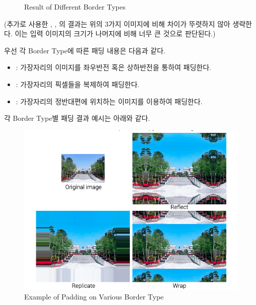 \documentclass{report}
\begin{document}
\begin{figure}[htbp]
    \medskip

    \hspace{1pt}
    \hspace{1pt}

    \caption{Result of Different Border Types}
\end{figure}

(추가로 사용한 , , 의 결과는 위의 3가지 이미지에 비해 차이가 뚜렷하지 않아 생략한다. 이는 입력 이미지의 크기가 나머지에 비해 너무 큰 것으로 판단된다.)


우선 각 Border Type에 따른 패딩 내용은 다음과 같다.

\begin{itemize}
    \item {} : 가장자리의 이미지를 좌우반전 혹은 상하반전을 통하여 패딩한다.
    \item {} : 가장자리의 픽셀들을 복제하여 패딩한다.
    \item {} : 가장자리의 정반대편에 위치하는 이미지를 이용하여 패딩한다.
\end{itemize}

각 Border Type별 패딩 결과 예시는 아래와 같다.

\begin{figure}[h]
    \centering
    \includegraphics[width=0.6\linewidth]{../images/ref/image1.png}
    \caption{Example of Padding on Various Border Type}
\end{figure}
\end{document}

